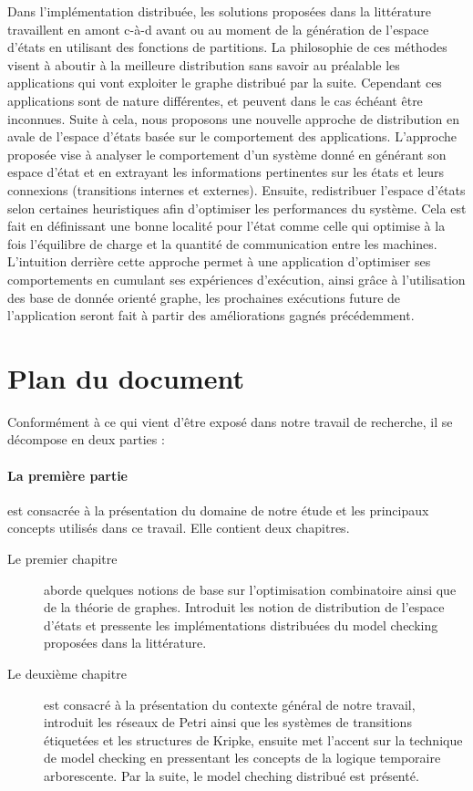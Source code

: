 Dans l’implémentation distribuée, les solutions proposées dans la littérature travaillent en amont c-à-d avant
ou au moment de la génération de l’espace d’états en utilisant des fonctions de partitions. La philosophie de ces méthodes visent à aboutir à la meilleure distribution sans savoir au préalable les applications qui vont exploiter le graphe distribué par la suite. Cependant ces applications sont de nature différentes, et peuvent dans le cas échéant être inconnues. Suite à cela, nous proposons une nouvelle approche de distribution en avale de l'espace d'états basée sur le comportement des applications. L’approche proposée vise à analyser le comportement d’un système donné en générant son espace d’état et en extrayant les informations pertinentes sur les états et leurs connexions (transitions internes et externes). Ensuite, redistribuer l’espace d’états selon certaines heuristiques afin d’optimiser les performances du système. Cela est fait en définissant une bonne localité pour l'état comme celle qui optimise à la
fois l’équilibre de charge et la quantité de communication entre les machines. L’intuition derrière cette approche permet à une application d'optimiser ses comportements en cumulant ses expériences d’exécution, ainsi grâce à l'utilisation des base de donnée orienté graphe, les prochaines exécutions future de l’application seront fait à partir des améliorations gagnés précédemment.

\section{Plan du document}
Conformément à ce qui vient d’être exposé dans notre travail de recherche, il se décompose en deux parties :

\paragraph{La première partie} est consacrée à la présentation du domaine de notre étude et les
principaux concepts utilisés dans ce travail. Elle contient deux chapitres.
\begin{description}
	\item[Le premier chapitre] aborde quelques notions de base sur l’optimisation combinatoire ainsi que de la théorie de graphes. Introduit les notion de distribution de l'espace d'états et pressente les implémentations distribuées du model checking proposées dans la littérature.
	\item [Le deuxième chapitre ] est consacré à la présentation du contexte général de notre travail, introduit les réseaux de Petri ainsi que les systèmes de transitions étiquetées et les structures de Kripke, ensuite met l’accent sur	la technique de model checking en pressentant les concepts de la logique temporaire arborescente. Par la suite, le model cheching distribué est présenté.
\end{description}


